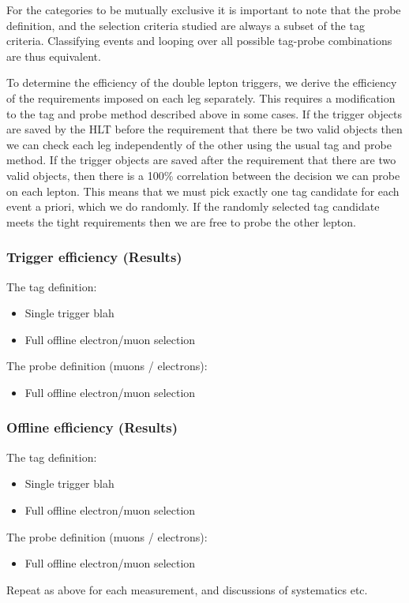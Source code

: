 For the categories to be mutually exclusive it is important to note that the probe definition, 
and the selection criteria studied are always a subset of the tag criteria.
Classifying events and looping over all possible tag-probe combinations are thus equivalent.

To determine the efficiency of the double lepton triggers, we derive the efficiency of the requirements imposed on each leg separately.
This requires a modification to the tag and probe method described above in some cases.
If the trigger objects are saved by the HLT before the requirement that there be two valid objects then
we can check each leg independently of the other using the usual tag and probe method.
If the trigger objects are saved after the requirement that there are two valid objects, then there is 
a 100\% correlation between the decision we can probe on each lepton.
This means that we must pick exactly one tag candidate for each event a priori, which we do 
randomly. 
If the randomly selected tag candidate meets the tight requirements then we are free to 
probe the other lepton.

\subsubsection{Trigger efficiency (Results)}

The tag definition:
\begin{itemize}
	\item  Single trigger blah
	\item Full offline electron/muon selection
\end{itemize}
	
The probe definition (muons / electrons):
\begin{itemize}
	\item  Full offline electron/muon selection
\end{itemize}

\subsubsection{Offline efficiency (Results)}

The tag definition:
\begin{itemize}
	\item  Single trigger blah
	\item Full offline electron/muon selection
\end{itemize}
	
The probe definition (muons / electrons):
\begin{itemize}
	\item  Full offline electron/muon selection
\end{itemize}

Repeat as above for each measurement, and discussions of systematics etc.


